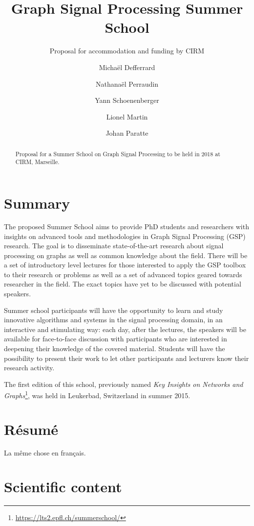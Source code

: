 \documentclass[a4paper]{scrartcl}
\begin{document}
\title{Graph Signal Processing Summer School}
\subtitle{Proposal for accommodation and funding by CIRM}
\author{
	Michaël Defferrard \and
	Nathanaël Perraudin \and
	Yann Schoenenberger \and
	Lionel Martin \and
	Johan Paratte}
\maketitle

\begin{abstract}
	Proposal for a Summer School on Graph Signal Processing to be held in 2018
	at CIRM, Marseille.
\end{abstract}

\section{Summary}

The proposed Summer School aims to provide PhD students and researchers with
insights on advanced tools and methodologies in Graph Signal Processing (GSP)
research. The goal is to disseminate state-of-the-art research about signal
processing on graphs as well as common knowledge about the field.
There will be a set of introductory level lectures for those interested to apply
the GSP toolbox to their research or problems as well as a set of advanced
topics geared towards researcher in the field. The exact topics have yet to be
discussed with potential speakers.

Summer school participants will have the opportunity to learn and study
innovative algorithms and systems in the signal processing domain, in an
interactive and stimulating way: each day, after the lectures, the speakers will
be available for face-to-face discussion with participants who are interested in
deepening their knowledge of the covered material. Students will have the
possibility to present their work to let other participants and lecturers know
their research activity.

The first edition of this school, previously named \textit{Key Insights on
Networks and Graphs}\footnote{ \url{https://lts2.epfl.ch/summerschool/}}, was
held in Leukerbad, Switzerland in summer 2015.

\section{Résumé}

La même chose en français.

\section{Scientific content}
\end{document}
